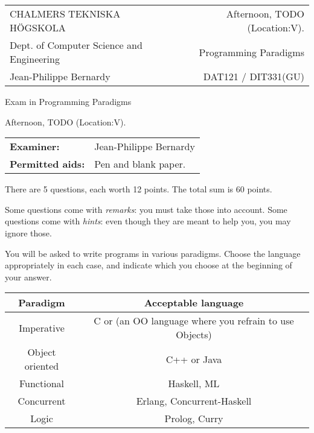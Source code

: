\documentclass{article}
\begin{document}
\setlength{\parskip}{2pt}

\newcommand{\examtime}{Afternoon, TODO  (Location:V)}
\newcommand{\points}[1]{\marginpar{\bf #1 points}}
\noindent
\begin{tabular}{lr}
CHALMERS TEKNISKA H\"OGSKOLA &\examtime{}.\\
Dept. of Computer Science and Engineering & Programming Paradigms\\
Jean-Philippe Bernardy                 & DAT121 / DIT331(GU) \\
\end{tabular}

\vspace{2.5cm} \noindent
\begin{center} {\LARGE
Exam in Programming Paradigms}
\end{center}

\vspace{1.5cm}

\noindent
\examtime{}.\\
\begin{tabular}{ll}
\textbf{Examiner:} & Jean-Philippe Bernardy \\
\textbf{Permitted aids:} & Pen and blank paper.
\end{tabular}
\vspace{1cm}

\noindent

There are 5 questions, each worth 12 points. The total sum is 60
points.

Some questions come with \emph{remarks}: you must take those
into account.
Some questions come with \emph{hints}: even though they are meant to help you, you may ignore those.

You will be asked to write programs in various paradigms. Choose the
language appropriately in each case, and indicate which you choose at
the beginning of your answer.

\begin{tabular}[p]{cc}
  Paradigm & Acceptable language \\ \hline
  Imperative   & C or (an OO language where you refrain to use Objects) \\
  Object oriented & C++ or Java \\
  Functional & Haskell, ML \\
  Concurrent & Erlang, Concurrent-Haskell \\
  Logic & Prolog, Curry
\end{tabular}
\end{document}
